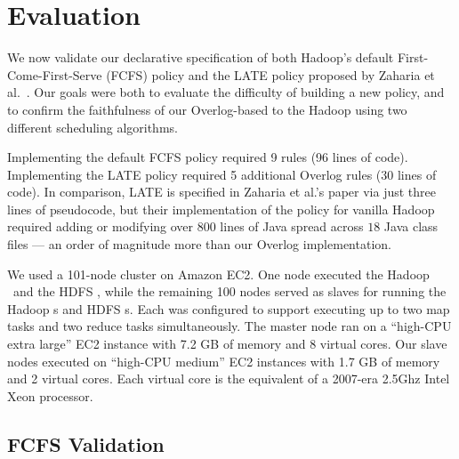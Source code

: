 \section{Evaluation}
\label{ch:boom:sec:eval}

We now validate our declarative specification of both Hadoop's default
First-Come-First-Serve (FCFS) policy and the LATE policy proposed by Zaharia et
al.~\cite{late-sched}. Our goals were both to evaluate the difficulty of
building a new policy, and to confirm the faithfulness of our Overlog-based
{\JT} to the Hadoop {\JT} using two different scheduling algorithms.

Implementing the default FCFS policy required 9 rules (96 lines of
code). Implementing the LATE policy required 5 additional Overlog rules (30
lines of code). In comparison, LATE is specified in Zaharia et al.'s paper via
just three lines of pseudocode, but their implementation of the policy for
vanilla Hadoop required adding or modifying over $800$ lines of Java spread 
across $18$ Java class files --- an order of magnitude more than our Overlog implementation. 

We used a 101-node cluster on Amazon EC2. One node executed the Hadoop \JT\ 
and the HDFS \NN, while the remaining 100 nodes served as slaves for running the 
Hadoop {\TT}s and HDFS {\DN}s. Each {\TT} was configured to support executing up 
to two map tasks and two reduce tasks simultaneously. The master node ran on a 
``high-CPU extra large'' EC2 instance with 7.2 GB of memory and 8 virtual cores. 
Our slave nodes executed on ``high-CPU medium'' EC2 instances with 1.7 GB of 
memory and 2 virtual cores. Each virtual core is the equivalent of a 2007-era 2.5Ghz Intel Xeon
processor.


\subsection{FCFS Validation}

